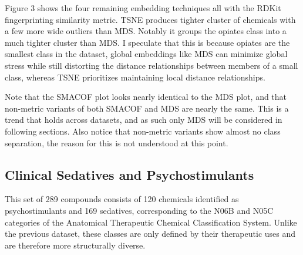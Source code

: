 \documentclass[12pt]{article}
\begin{document}
Figure 3 shows the four remaining embedding techniques all with the RDKit fingerprinting similarity metric. TSNE produces tighter cluster of chemicals with a few more wide outliers than MDS. Notably it groups the opiates class into a much tighter cluster than MDS. I speculate that this is because opiates are the smallest class in the dataset, global embeddings like MDS can minimize global stress while still distorting the distance relationships between members of a small class, whereas TSNE prioritizes maintaining local distance relationships.

Note that the SMACOF plot looks nearly identical to the MDS plot, and that non-metric variants of both SMACOF and MDS are nearly the same. This is a trend that holds across datasets, and as such only MDS will be considered in following sections. Also notice that non-metric variants show almost no class separation, the reason for this is not understood at this point.

\subsection{Clinical Sedatives and Psychostimulants}
This set of 289 compounds consists of 120 chemicals identified as psychostimulants and 169 sedatives, corresponding to the N06B and N05C categories of the Anatomical Therapeutic Chemical Classification System. Unlike the previous dataset, these classes are only defined by their therapeutic uses and are therefore more structurally diverse.
\end{document}
